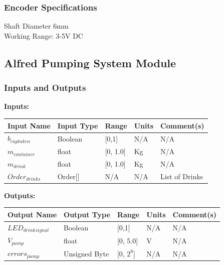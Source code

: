 \documentclass [10pt]{article}
\begin{document}

\subsubsection{Encoder Specifications}
Shaft Diameter 6mm\\
Working Range: 3-5V DC\\


\subsection{Alfred Pumping System Module}


\subsubsection{Inputs and Outputs}

\textbf{Inputs: } \\

\begin{longtable}{|l|l|l|l|l|}\hline 
		\rowcolor{tableCell}\textbf{Input Name} & \textbf{Input Type} & \textbf{Range} & \textbf{Units} & \textbf{Comment(s)} \\ \hline
		$ b_{cuptaken } $ & Boolean & [0,1] & N/A &  N/A\\ \hline
		\rowcolor{tableCell}$ m_{container} $ & float & [0, 1.0]& Kg & N/A\\ \hline
		$ m_{drink} $    & float & [0, 1.0] & Kg &  N/A\\ \hline
		\rowcolor{tableCell}$ Order_{drinks} $ & Order[] & N/A  & N/A & List of Drinks  \\ \hline
\end{longtable}

\textbf{Outputs: } \\

\begin{longtable}{|l|l|l|l|l|}\hline 
	\rowcolor{tableCell}\textbf{Output Name} & \textbf{Output Type} & \textbf{Range} & \textbf{Units} & \textbf{Comment(s)} \\ \hline
	$ LED_{drinksignal} $ & Boolean & [0,1] & N/A &  N/A\\ \hline
	\rowcolor{tableCell}$ V_{pump } $ & float & [0, 5.0]& V & N/A\\ \hline
	$  errors_{pump} $ & Unsigned Byte & [0, $2^{8}$]& N/A & N/A\\ \hline
\end{longtable}
\end{document}

